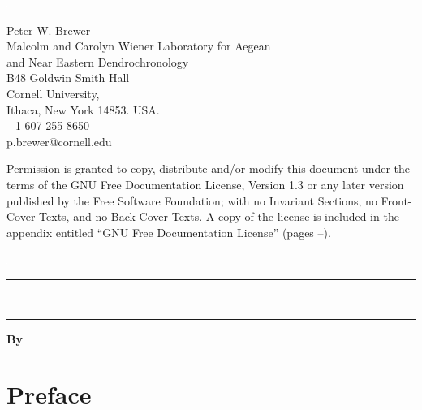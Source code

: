 


\thispagestyle{empty} 
\includegraphics{Images/pixel.png}
\vfill
\parbox[b]{11cm}{\raggedright

 Peter W. Brewer\\ Malcolm and Carolyn Wiener Laboratory for Aegean\\ and Near Eastern Dendrochronology \\
B48 Goldwin Smith Hall\\ Cornell University, \\ Ithaca, New York 14853. USA.\\[0.5cm] \Telefon\hspace{3mm}+1 607 255 8650 \\ \Letter\hspace{3mm}p.brewer@cornell.edu\\[15mm]}

{\footnotesize 
Permission is granted to copy, distribute and/or modify this document
under the terms of the GNU Free Documentation License, Version 1.3
or any later version published by the Free Software Foundation;
with no Invariant Sections, no Front-Cover Texts, and no Back-Cover Texts.
A copy of the license is included in the appendix entitled ``GNU Free Documentation License'' (pages \pageref{txt:FDLStart}--\pageref{txt:FDLEnd}).}



\newpage
{}
\setcounter{page}{1}
\thispagestyle{empty} 
{ \includegraphics{Images/pixel.png}\\[4cm] 
\hrule 
\vspace{5mm}
\Huge \bfseries \thetitle\\[3mm] 
\large{\thesubtitle}
\vspace{5mm}
\hrule
\vspace{3cm}
}
{
\normalsize
\textbf{By \authornames}\\[0.6cm]
}

\newpage


\tableofcontents


\cleardoublepage
{} 

\section*{Preface}
\thispagestyle{empty} 

